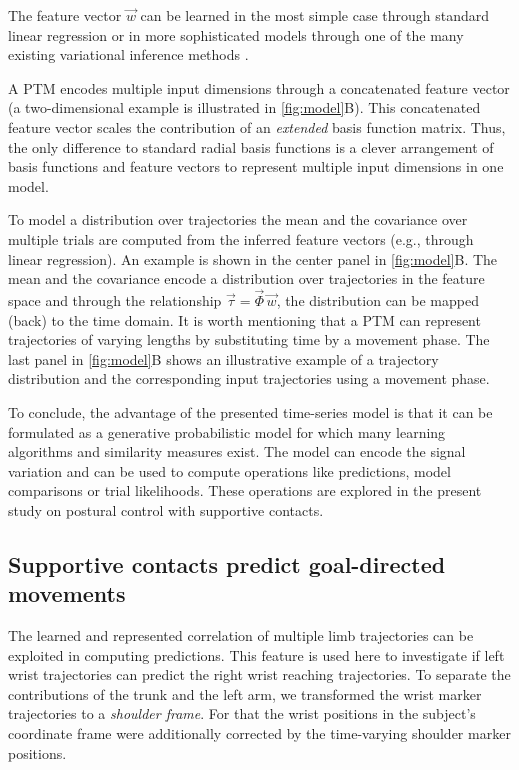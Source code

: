 The feature vector 
$\vec w$ can be learned in the most simple case through standard linear 
regression or in more sophisticated models through one of the many existing 
variational inference methods \cite{Rueckert2015}. 

A PTM encodes multiple input dimensions through a concatenated feature vector (a 
two-dimensional example is illustrated in \FigureAbbrP 
\ref{fig:model}B). This concatenated feature vector scales the contribution of an 
\textit{extended} basis function matrix. Thus, the only difference to standard 
radial basis functions is a clever arrangement of basis functions and feature 
vectors to represent multiple input dimensions in one model. 
 
To model a distribution over trajectories the mean and the covariance over multiple trials are computed from the 
inferred feature vectors (e.g., through linear regression). An example is shown 
in the center panel in \FigureAbbr \ref{fig:model}B. The mean and 
the covariance encode a distribution over trajectories in the feature space and 
through the relationship $\vec \tau = \vec \Phi \, \vec w$, the distribution can 
be mapped (back) to the time domain. It is worth mentioning that a PTM can 
represent trajectories of varying lengths by substituting time by a movement 
phase. The last panel in \FigureAbbr \ref{fig:model}B shows an 
illustrative example of a trajectory distribution and the corresponding input 
trajectories using a movement phase.    

To conclude, the advantage of the presented time-series model is that it can be formulated as a 
generative probabilistic model for which many learning algorithms and similarity 
measures exist. The model can encode the signal variation and can be used to 
compute operations like predictions, model comparisons or trial likelihoods. 
These operations are explored in the present study on postural control with supportive 
contacts. 


\subsection{Supportive contacts predict goal-directed movements}

The learned and represented correlation of multiple limb trajectories can be 
exploited in computing predictions. This feature is used here to investigate if 
left wrist trajectories can predict the right wrist 
reaching trajectories. To separate the contributions of the trunk and the left 
arm, we transformed the wrist marker trajectories to a \textit{shoulder frame}. 
For that the wrist positions in the subject's coordinate frame were additionally 
corrected by the time-varying shoulder marker positions. 

